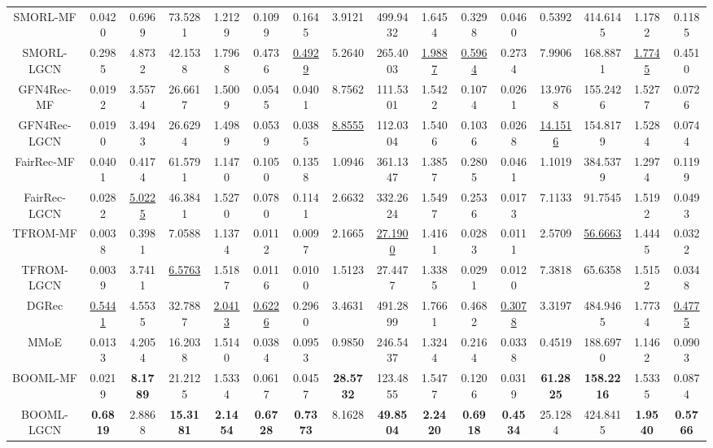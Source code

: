 \begin{table*}[!ht]
\begin{tabular}{|c|ccccc|ccccc|ccccc|}
    SMORL-MF   & 0.0420      & 0.6969      & 73.5281      & 1.2129     & 0.1099 & 0.1645     & 3.9121      & 499.9432     & 1.6454     & 0.3298 & 0.0460      & 0.5392      & 414.6145     & 1.1782     & 0.1185
    \\
    SMORL-LGCN & 0.2985     & 4.8732      & 42.1538      & 1.7968    & 0.4736 & \underline{0.4929}      & 5.2640      & 265.4003     & \underline{1.9887}     & \underline{0.5964} & 0.2734      & 7.9906      & 168.8871     & \underline{1.7745}     & 0.4510
    \\
    GFN4Rec-MF &0.0192 & 3.5574&26.6617 &1.5009&0.0545 &0.0401	&8.7562&111.5301 &1.5422	&0.1074 &0.0261	&13.9768	&155.2426	&1.5277	&0.0726
    \\
    GFN4Rec-LGCN &0.0190	&3.4943	&26.6294	&1.4989 &0.0539 &0.0385	&\underline{8.8555}	&112.0304	&1.5406	&0.1036 &0.0268	&\underline{14.1516}	&154.8179	&1.5284	&0.0744
    \\
    FairRec-MF & 0.0401 & 0.4174  & 61.5791 & 1.1470 & 0.1050  & 0.1358 & 1.0946  & 361.1347 & 1.3857 & 0.2805  & 0.0461 & 1.1019  & 384.5379 & 1.2974 & 0.1199
    \\
    FairRec-LGCN & 0.0282 & \underline{5.0225}  & 46.3841 & 1.5270 & 0.0780  & 0.1141 & 2.6632  & 332.2624 & 1.5497 & 0.2536  & 0.0173 & 7.1133  & 91.7545  & 1.5192 & 0.0493
    \\ 
    TFROM-MF  & 0.0038  & 0.3981  & 7.0588  & 1.1374 & 0.0112  & 0.0097  & 2.1665  & \underline{27.1900} & 1.4161 &0.0283   & 0.0111  & 2.5709  & \underline{56.6663}& 1.4445 & 0.0322
    \\
    TFROM-LGCN & 0.0039  & 3.7411  & \underline{6.5763}  & 1.5187 & 0.0116  & 0.0100  & 1.5123  & 27.4477 & 1.3385 & 0.0291 & 0.0120  & 7.3818  & 65.6358 & 1.5152 & 0.0348  
    \\
    DGRec & \underline{0.5441}    & 4.5535   & 32.7887    & \underline{2.0413}   & \underline{0.6226}  & 0.2960   & 3.4631    & 491.2899   & 1.7661   & 0.4682 & \underline{0.3078}    & 3.3197    & 484.9465   & 1.7734   & \underline{0.4775}
    \\
    MMoE & 0.0133 & 4.2054  & 16.2038& 1.5140 & 0.0384  & 0.0953 & 0.9850  & 246.5437 & 1.3244 & 0.2164  & 0.0338 & 0.4519  & 188.6970 & 1.1462 & 0.0903
    \\\hline  
    
    BOOML-MF & 0.0219 & \textbf{8.1789}  & 21.2125  & 1.5334 & 0.0617 & 0.0457 & \textbf{28.5732} & 123.4855 & 1.5477 & 0.1206  & 0.0319 & \textbf{61.2825} & \textbf{158.2216} & 1.5335 & 0.0874
    \\
     BOOML-LGCN & \textbf{0.6819} & 2.8868  & \textbf{15.3181}  & \textbf{2.1454} & \textbf{0.6728} & \textbf{0.7373} & 8.1628  & \textbf{49.8504}  & \textbf{2.2420} & \textbf{0.6918} & \textbf{0.4534} & 25.1284 & 424.8415 & \textbf{1.9540} & \textbf{0.5766}
     \\


\end{tabular}
\end{table*}
